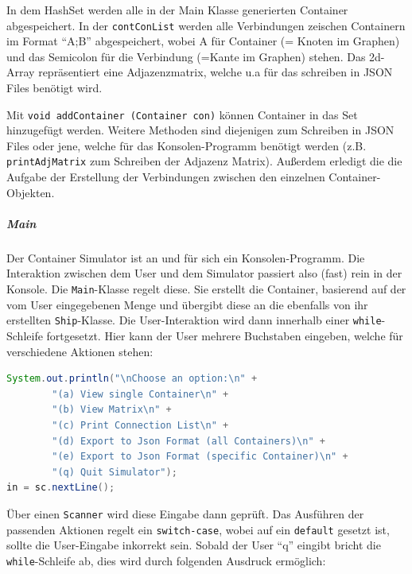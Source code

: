 \documentclass[
    headings=optiontotocandhead,%
    twoside,
    numbers=noenddot,%
    12pt, %
    titlepage, %
    parskip=full, %
    listof=leveldown, 
    numbers=noenddot, %
    a4paper,DIV=14,
    BCOR=15mm,
]{scrbook}
\newcommand{\passthrough}[1]{#1}
\begin{document}
In dem HashSet werden alle in der Main Klasse generierten Container
abgespeichert. In der \passthrough{\lstinline!contConList!} werden alle
Verbindungen zeischen Containern im Format ``A;B'' abgespeichert, wobei
A für Container (= Knoten im Graphen) und das Semicolon für die
Verbindung (=Kante im Graphen) stehen. Das 2d-Array repräsentiert eine
Adjazenzmatrix, welche u.a für das schreiben in JSON Files benötigt
wird.

Mit \passthrough{\lstinline!void addContainer (Container con)!} können
Container in das Set hinzugefügt werden. Weitere Methoden sind
diejenigen zum Schreiben in JSON Files oder jene, welche für das
Konsolen-Programm benötigt werden (z.B.
\passthrough{\lstinline!printAdjMatrix!} zum Schreiben der Adjazenz
Matrix). Außerdem erledigt die die Aufgabe der Erstellung der
Verbindungen zwischen den einzelnen Container-Objekten.

\hypertarget{main}{%
\subparagraph{Main}\label{main}}

Der Container Simulator ist an und für sich ein Konsolen-Programm. Die
Interaktion zwischen dem User und dem Simulator passiert also (fast)
rein in der Konsole. Die \passthrough{\lstinline!Main!}-Klasse regelt
diese. Sie erstellt die Container, basierend auf der vom User
eingegebenen Menge und übergibt diese an die ebenfalls von ihr
erstellten \passthrough{\lstinline!Ship!}-Klasse. Die User-Interaktion
wird dann innerhalb einer \passthrough{\lstinline!while!}-Schleife
fortgesetzt. Hier kann der User mehrere Buchstaben eingeben, welche für
verschiedene Aktionen stehen:

\begin{lstlisting}[language=Java, caption={Auswahlmöglichkeiten des Simulators}]
System.out.println("\nChoose an option:\n" +
        "(a) View single Container\n" +
        "(b) View Matrix\n" +
        "(c) Print Connection List\n" +
        "(d) Export to Json Format (all Containers)\n" +
        "(e) Export to Json Format (specific Container)\n" +
        "(q) Quit Simulator");
in = sc.nextLine();
\end{lstlisting}

Über einen \passthrough{\lstinline!Scanner!} wird diese Eingabe dann
geprüft. Das Ausführen der passenden Aktionen regelt ein
\passthrough{\lstinline!switch-case!}, wobei auf ein
\passthrough{\lstinline!default!} gesetzt ist, sollte die User-Eingabe
inkorrekt sein. Sobald der User ``q'' eingibt bricht die
\passthrough{\lstinline!while!}-Schleife ab, dies wird durch folgenden
Ausdruck ermöglich:
\end{document}
